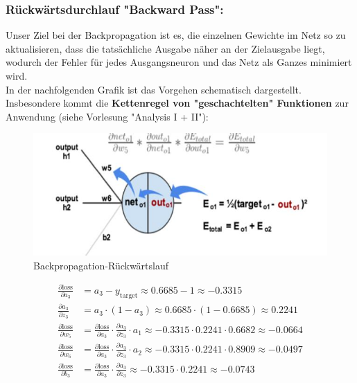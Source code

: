 \documentclass[12pt]{article}
\begin{document}
\subsubsection{Rückwärtsdurchlauf "Backward Pass":}
Unser Ziel bei der Backpropagation ist es, die einzelnen Gewichte im Netz so zu aktualisieren, dass die tatsächliche Ausgabe näher an der Zielausgabe liegt, wodurch der Fehler für jedes Ausgangsneuron und das Netz als Ganzes minimiert wird.\\
In der nachfolgenden Grafik ist das Vorgehen schematisch dargestellt. Insbesondere kommt die \textbf{Kettenregel von "geschachtelten" Funktionen} zur Anwendung (siehe Vorlesung "Analysis I + II"):

\begin{figure}[htp]
  \centering
  \vspace*{0.2cm}
 \includegraphics{Backpropagation-BP} 
  \vspace*{-0.5cm}
  \caption{Backpropagation-Rückwärtslauf}
\end{figure}
{\color{red}{*******************************************************************\\ ******* ab hier bis Ende subsection ist dass noch anzupassen ******* \\
********************************************************************\\}}
\[
\begin{aligned}
\frac{\partial \text{loss}}{\partial a_3} &= a_3 - y_{\text{target}} \approx 0.6685 - 1 \approx -0.3315 \\
\frac{\partial a_3}{\partial z_3} &= a_3 \cdot (1 - a_3) \approx 0.6685 \cdot (1 - 0.6685) \approx 0.2241 \\
\frac{\partial \text{loss}}{\partial w_5} &= \frac{\partial \text{loss}}{\partial a_3} \cdot \frac{\partial a_3}{\partial z_3} \cdot a_1 \approx -0.3315 \cdot 0.2241 \cdot 0.6682 \approx -0.0664 \\
\frac{\partial \text{loss}}{\partial w_6} &= \frac{\partial \text{loss}}{\partial a_3} \cdot \frac{\partial a_3}{\partial z_3} \cdot a_2 \approx -0.3315 \cdot 0.2241 \cdot 0.8909 \approx -0.0497 \\
\frac{\partial \text{loss}}{\partial b_3} &= \frac{\partial \text{loss}}{\partial a_3} \cdot \frac{\partial a_3}{\partial z_3} \approx -0.3315 \cdot 0.2241 \approx -0.0743 \\
\end{aligned}
\] \\[0.2cm]
\end{document}
